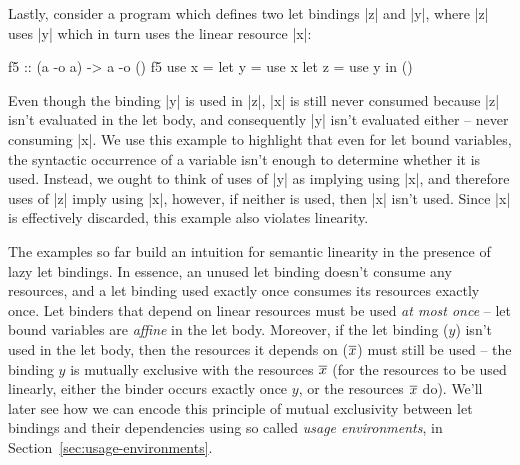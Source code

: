 \documentclass[acmsmall, screen, review]{acmart}
\newcommand{\parawith}[1]{\paragraph{\emph{#1}}}
\begin{document}
Lastly, consider a program which defines two let bindings |z| and |y|, where
|z| uses |y| which in turn uses the linear resource |x|:
%
\begin{noway}
\begin{code}
f5 :: (a -o a) -> a -o ()
f5 use x =
  let y = use x
  let z = use y
  in ()
\end{code}
\end{noway}
%
Even though the binding |y| is used in |z|, |x| is still never consumed because
|z| isn't evaluated in the let body, and consequently |y| isn't evaluated
either -- never consuming |x|. We use this example to highlight that even for
let bound variables, the syntactic occurrence of a variable isn't enough to
determine whether it is used. Instead, we ought to think of uses of |y| as
implying using |x|, and therefore uses of |z| imply using |x|, however, if
neither is used, then |x| isn't used. Since |x| is effectively discarded, this
example also violates linearity.

The examples so far build an intuition for semantic linearity in the presence
of lazy let bindings. In essence, an unused let binding doesn't consume any
resources, and a let binding used exactly once consumes its resources exactly
once. Let binders that depend on linear resources must be used \emph{at most
once} -- let bound variables are \emph{affine} in the let body.
%
Moreover, if the let binding ($y$) isn't used in the let body, then the
resources it depends on ($\overline{x}$) must still be used -- the binding $y$ is
mutually exclusive with the resources $\overline{x}$ (for the resources to be used
linearly, either the binder occurs exactly once $y$, or the resources $\overline{x}$
do). We'll later see how we can encode this principle of mutual exclusivity
between let bindings and their dependencies using so called \emph{usage
environments}, in Section~\ref{sec:usage-environments}.
\end{document}
